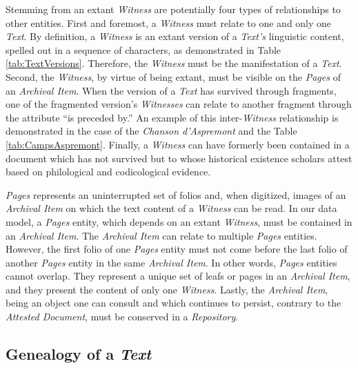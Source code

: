 Stemming from an extant \textit{Witness} are potentially four types of relationships to other entities. First and foremost, a \textit{Witness} must relate to one and only one \textit{Text}. By definition, a \textit{Witness} is an extant version of a \textit{Text's} linguistic content, spelled out in a sequence of characters, as demonstrated in Table \ref{tab:TextVersions}. Therefore, the \textit{Witness} must be the manifestation of a \textit{Text}. Second, the \textit{Witness}, by virtue of being extant, must be visible on the \textit{Pages} of an \textit{Archival Item}. When the version of a \textit{Text} has survived through fragments, one of the fragmented version's \textit{Witnesses} can relate to another fragment through the attribute ``is preceded by.'' An example of this inter-\textit{Witness} relationship is demonstrated in the case of the \textit{Chanson d'Aspremont} and the Table \ref{tab:CampsAspremont}. Finally, a \textit{Witness} can have formerly been contained in a document which has not survived but to whose historical existence scholars attest based on philological and codicological evidence.

\textit{Pages} represents an uninterrupted set of folios and, when digitized, images of an \textit{Archival Item} on which the text content of a \textit{Witness} can be read. In our data model, a \textit{Pages} entity, which depends on an extant \textit{Witness}, must be contained in an \textit{Archival Item}. The \textit{Archival Item} can relate to multiple \textit{Pages} entities. However, the first folio of one \textit{Pages} entity must not come before the last folio of another \textit{Pages} entity in the same \textit{Archival Item}. In other words, \textit{Pages} entities cannot overlap. They represent a unique set of leafs or pages in an \textit{Archival Item}, and they present the content of only one \textit{Witness}. Lastly, the \textit{Archival Item}, being an object one can consult and which continues to persist, contrary to the \textit{Attested Document}, must be conserved in a \textit{Repository}.

\subsection{Genealogy of a \textit{Text}}
\label{sub:Graph}

